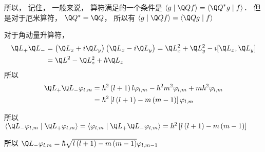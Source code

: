 
所以， 记住， 一般来说， 算符满足的一个条件是 $\left\langle {g}
 \mathrel{\left | {\vphantom {g {\Q Qf}}}
 \right. \kern-\nulldelimiterspace}
 {{\Q Qf}} \right\rangle  = \left\langle {{{{\Q Q}^ * }g}}
 \mathrel{\left | {\vphantom {{{{\Q Q}^ * }g} f}}
 \right. \kern-\nulldelimiterspace}
 {f} \right\rangle $．   但是对于厄米算符， ${\Q Q^ * } = \Q Q$，   所以有 $\left\langle {g}
 \mathrel{\left | {\vphantom {g {\Q Qf}}}
 \right. \kern-\nulldelimiterspace}
 {{\Q Qf}} \right\rangle  = \left\langle {{\Q Qg}}
 \mathrel{\left | {\vphantom {{\Q Qg} f}}
 \right. \kern-\nulldelimiterspace}
 {f} \right\rangle $  

对于角动量升算符， 
 \begin{equation}
\begin{aligned}
  {{\Q L}_ + }{{\Q L}_ - } &= \left( {{{\Q L}_x} + i{{\Q L}_y}} \right)\left( {{{\Q L}_x} - i{{\Q L}_y}} \right) = \Q L_x^2 + \Q L_y^2 - i[{{\Q L}_x},{{\Q L}_y}] \hfill \\
   &= {{\Q L}^2} - \Q L_z^2 + \hbar {{\Q L}_z} \hfill \\ 
\end{aligned} 
\end{equation}
所以
 \begin{equation}
\begin{aligned}
  {{\Q L}_ + }{{\Q L}_ - }{\varphi_{l,m}}&= {\hbar ^2}\left( {l + 1} \right)l{\varphi_{l,m}} - {\hbar ^2}{m^2}{\varphi_{l,m}} + m{\hbar ^2}{\varphi_{l,m}} \hfill \\
  & = {\hbar ^2}\left[ {l\left( {l + 1} \right) - m\left( {m - 1} \right)} \right]{\varphi_{l,m}} \hfill \\ 
\end{aligned} 
\end{equation}

所以  $\left\langle {{{{\Q L}_ - }{\varphi_{l,m}}}}
 \mathrel{\left | {\vphantom {{{{\Q L}_ - }{\varphi_{l,m}}} {{{\Q L}_ + }{\varphi_{l,m}}}}}
 \right. \kern-\nulldelimiterspace}
 {{{{\Q L}_ + }{\varphi_{l,m}}}} \right\rangle  = \left\langle {{{\varphi_{l,m}}}}
 \mathrel{\left | {\vphantom {{{\varphi_{l,m}}} {{{\Q L}_ + }{{\Q L}_ - }{\varphi_{l,m}}}}}
 \right. \kern-\nulldelimiterspace}
 {{{{\Q L}_ + }{{\Q L}_ - }{\varphi_{l,m}}}} \right\rangle  = {\hbar ^2}\left[ {l\left( {l + 1} \right) - m\left( {m - 1} \right)} \right]$  
 
所以 ${\Q L_ - }{\varphi_{l,m}} = \hbar \sqrt {l\left( {l + 1} \right) - m\left( {m - 1} \right)} {\varphi_{l,m - 1}}$ 

